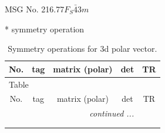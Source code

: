 \documentclass[fleqn,8pt]{jsarticle}
\begin{document}
\setcounter{MaxMatrixCols}{32}

\renewcommand{\tablename}{Table~}
\renewcommand{\figurename}{Figure~}
\begin{center}
\LARGE
MSG No. 216.77\quad$F_{S}\bar{4}3m$
\end{center}
* symmetry operation
\renewcommand{\arraystretch}{1.3}
\begin{longtable}{ccccc}
\caption{Symmetry operations for 3d polar vector.}
 \\
 \hline \hline
No. & tag & matrix (polar) & det & TR \\ \hline \endfirsthead

\multicolumn{4}{l}{\tablename\ \thetable{}} \\
 \hline \hline
No. & tag & matrix (polar) & det & TR \\ \hline \endhead

 \hline \hline
\multicolumn{4}{r}{\footnotesize\it continued ...} \\ \endfoot

 \hline \hline
\multicolumn{4}{r}{} \\ \endlastfoot


\end{longtable}
\end{document}
